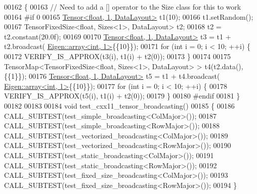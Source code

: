\begin{DoxyCode}
00162 \{
00163   \textcolor{comment}{// Need to add a [] operator to the Size class for this to work}
00164 \textcolor{preprocessor}{#if 0}
00165   \hyperlink{class_eigen_1_1_tensor}{Tensor<float, 1, DataLayout>} t1(10);
00166   t1.setRandom();
00167   TensorFixedSize<float, Sizes<1>, DataLayout> t2;
00168   t2 = t2.constant(20.0f);
00169 
00170   \hyperlink{class_eigen_1_1_tensor}{Tensor<float, 1, DataLayout>} t3 = t1 + t2.broadcast(
      \hyperlink{class_eigen_1_1array}{Eigen::array<int, 1>}\{\{10\}\});
00171   \textcolor{keywordflow}{for} (\textcolor{keywordtype}{int} i = 0; i < 10; ++i) \{
00172     VERIFY\_IS\_APPROX(t3(i), t1(i) + t2(0));
00173   \}
00174 
00175   TensorMap<TensorFixedSize<float, Sizes<1>, DataLayout> > t4(t2.data(), \{\{1\}\});
00176   \hyperlink{class_eigen_1_1_tensor}{Tensor<float, 1, DataLayout>} t5 = t1 + t4.broadcast(
      \hyperlink{class_eigen_1_1array}{Eigen::array<int, 1>}\{\{10\}\});
00177   \textcolor{keywordflow}{for} (\textcolor{keywordtype}{int} i = 0; i < 10; ++i) \{
00178     VERIFY\_IS\_APPROX(t5(i), t1(i) + t2(0));
00179   \}
00180 \textcolor{preprocessor}{#endif}
00181 \}
00182 
00183 
00184 \textcolor{keywordtype}{void} test\_cxx11\_tensor\_broadcasting()
00185 \{
00186   CALL\_SUBTEST(test\_simple\_broadcasting<ColMajor>());
00187   CALL\_SUBTEST(test\_simple\_broadcasting<RowMajor>());
00188   CALL\_SUBTEST(test\_vectorized\_broadcasting<ColMajor>());
00189   CALL\_SUBTEST(test\_vectorized\_broadcasting<RowMajor>());
00190   CALL\_SUBTEST(test\_static\_broadcasting<ColMajor>());
00191   CALL\_SUBTEST(test\_static\_broadcasting<RowMajor>());
00192   CALL\_SUBTEST(test\_fixed\_size\_broadcasting<ColMajor>());
00193   CALL\_SUBTEST(test\_fixed\_size\_broadcasting<RowMajor>());
00194 \}
\end{DoxyCode}
